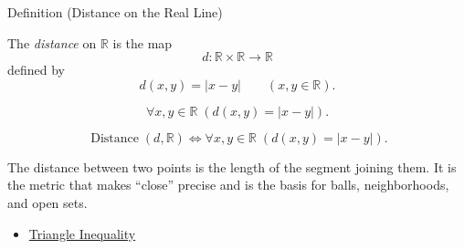 \begin{definitionbox}{Definition (Distance on the Real Line)}
\begin{definition}
\label{def:distance-on-real-line}
The \emph{distance} on $\mathbb{R}$ is the map
\[
  d:\mathbb{R}\times\mathbb{R}\longrightarrow\mathbb{R}
\]
defined by
\[
  d(x,y)=|x-y|
  \qquad(x,y\in\mathbb{R}).
\]
\end{definition}
\end{definitionbox}
\begin{remark*}
\[
\forall x,y\in\mathbb{R}\;(d(x,y)=|x-y|).
\]
\end{remark*}
\begin{remark*}
\[
\operatorname{Distance}(d,\mathbb{R})
\Longleftrightarrow
\forall x,y\in\mathbb{R}\;(d(x,y)=|x-y|).
\]
\end{remark*}
\begin{remark*}[Interpretation]
The distance between two points is the length of the segment joining them. It is the metric that makes ``close'' precise and is the basis for balls, neighborhoods, and open sets.
\end{remark*}
\begin{dependencies}
\begin{itemize}
  \item \hyperref[thm:triangle-inequality]{Triangle Inequality}
\end{itemize}
\end{dependencies}
